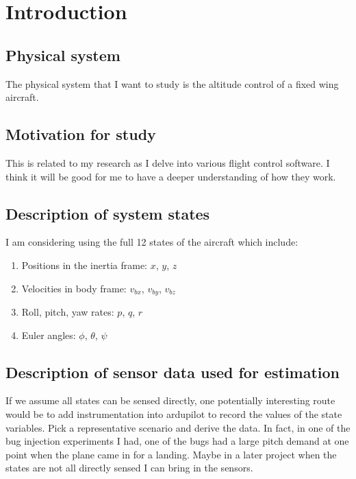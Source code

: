 \section{Introduction} \label{sec:intro}

\subsection{Physical system}

The physical system that I want to study is the altitude control of a
fixed wing aircraft.

\subsection{Motivation for study}

This is related to my research as I delve into various flight control
software. I think it will be good for me to have a deeper
understanding of how they work.

\subsection{Description of system states}

I am considering using the full 12 states of the aircraft which
include:

\begin{enumerate}
\item Positions in the inertia frame: $x$, $y$, $z$ 
\item Velocities in body frame: $v_{bx}$, $v_{by}$, $v_{bz}$
\item Roll, pitch, yaw rates: $p$, $q$, $r$
\item Euler angles: $\phi$, $\theta$, $\psi$
\end{enumerate}

\subsection{Description of sensor data used for estimation}

If we assume all states can be sensed directly, one potentially
interesting route would be to add instrumentation into ardupilot to
record the values of the state variables. Pick a representative
scenario and derive the data. In fact, in one of the bug injection
experiments I had, one of the bugs had a large pitch demand at one point
when the plane came in for a landing. Maybe in a later project when the states
are not all directly sensed I can bring in the sensors.

